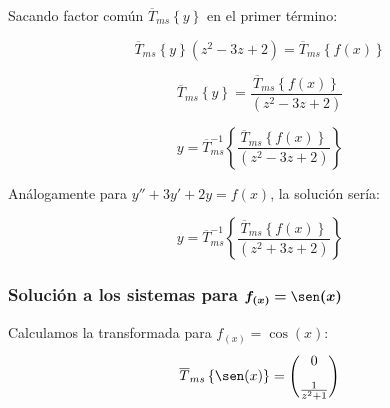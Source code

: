 \documentclass[12pt]{article}
\begin{document}
Sacando factor común $\overline{T}_{ms}\left\{y\right\}$ en el primer término:

$$
\overline{T}_{ms}\left\{y\right\} \left( z^2 - 3z + 2\right) = \overline{T}_{ms}\left\{f(x)\right\}
$$

$$
\overline{T}_{ms}\left\{y\right\} = \frac{\overline{T}_{ms}\left\{f(x)\right\}}{\left( z^2 - 3z + 2\right) }
$$


$$
y =\overline{T}_{ms}^{-1}\left\{ \frac{\overline{T}_{ms}\left\{f(x)\right\}}{\left( z^2 - 3z + 2\right) }\right\}
$$


Análogamente para $y''+3y'+2y=f(x)$, la solución sería:


$$
y =\overline{T}_{ms}^{-1}\left\{ \frac{\overline{T}_{ms}\left\{f(x)\right\}}{\left( z^2 + 3z + 2\right) }\right\}
$$

\subsubsection{Solución a los sistemas para $\bm{ f_{(x)}=\sen(x)}$}

Calculamos la transformada para $f_{(x)} = \cos(x)$:
$$
\overline{T}_{ms}\left\{\sen(x)\right\} = \begin{pmatrix}
0\\[0.3cm]
\frac{1}{z^2+1}
\end{pmatrix}
$$
\end{document}
